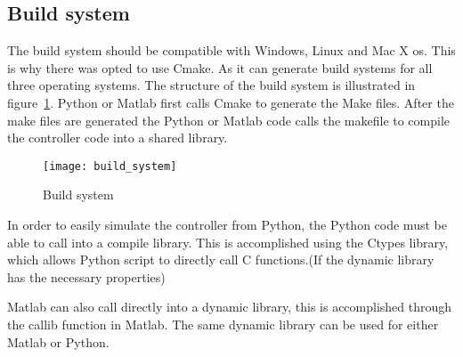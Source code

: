 \subsection{Build system}
The build system should be compatible with Windows, Linux and Mac X os. This is why there was opted to use Cmake. As it can generate build systems for all three operating systems. The structure of the build system is illustrated in figure~\ref{fig:build system}. Python or Matlab first calls Cmake to generate the Make files. After the make files are generated the Python or Matlab code calls the makefile to compile the controller code into a shared library.
\begin{figure}[H]
	\centering
	\texttt{[image: build\_system]}
	\caption{Build system}
	\label{fig:build system}
\end{figure}
In order to easily simulate the controller from Python, the Python code must be able to call into a compile library. This is accomplished using the Ctypes library, which allows Python script to directly call C functions.(If the dynamic library has the necessary properties)

Matlab can also call directly into a dynamic library, this is accomplished through the callib function in Matlab. The same dynamic library can be used for either Matlab or Python.

